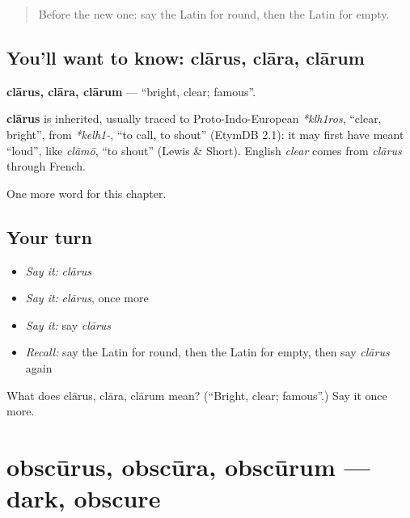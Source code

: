 \label{lesson:LA-C96-clarus}



\begin{quote}
Before the new one: say the Latin for round, then the Latin for empty.
\end{quote}

\subsection*{You'll want to know: clārus, clāra, clārum}
\textbf{clārus, clāra, clārum} — \textquotedblleft{}bright, clear; famous\textquotedblright{}.

\begin{cousinweb}
\textbf{clārus} is inherited, usually traced to Proto-Indo-European \emph{*klh1ros}, \textquotedblleft{}clear, bright\textquotedblright{}, from \emph{*kelh1-}, \textquotedblleft{}to call, to shout\textquotedblright{} (EtymDB 2.1): it may first have meant \textquotedblleft{}loud\textquotedblright{}, like \emph{clāmō}, \textquotedblleft{}to shout\textquotedblright{} (Lewis \& Short). English \emph{clear} comes from \emph{clārus} through French.
\end{cousinweb}

\begin{grammarlens}[title={What you've built}]
One more word for this chapter.
\end{grammarlens}

\subsection*{Your turn}
\begin{itemize}
\raggedright
  \item \emph{Say it:} \emph{clārus}
  \item \emph{Say it:} \emph{clārus}, once more
  \item \emph{Say it:} say \emph{clārus}
  \item \emph{Recall:} say the Latin for round, then the Latin for empty, then say \emph{clārus} again
\end{itemize}

\begin{tcolorbox}[breakable,colback=teal!4,colframe=teal!35!black,title={Before you move on}]
What does clārus, clāra, clārum mean? (\textquotedblleft{}Bright, clear; famous\textquotedblright{}.) Say it once more.
\end{tcolorbox}
\section[obscūrus, obscūra, obscūrum]{obscūrus, obscūra, obscūrum — dark, obscure}


